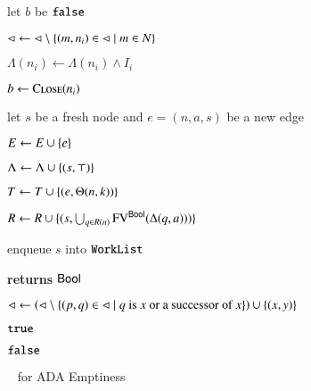 \documentclass[10pt,conference,letterpaper,twocolumn]{IEEEtran}
\begin{document}
\begin{algorithm}[t!]
{\begin{algorithmic}[1]
  \State let $b$ be $\mathtt{false}$



  \State $\lhd \leftarrow \lhd \setminus \left\{ (m,n_i) \in \lhd \mid m \in N \right\}$

  \State $\Lambda(n_i) \leftarrow \Lambda(n_i) \wedge I_i$


  \State $b \leftarrow \Call{Close}{n_i}$
  \label{ln:refine-end}

  \EndIf

  \EndIf

  \EndFor

  \EndIf

  \EndIf

  \label{ln:expand-begin}

  \State let $s$ be a fresh node and $e = (n,a,s)$ be a new edge

  \State $E \leftarrow E \cup \left\{ e \right\}$
  \label{ln:edge-insert}

  \State $\Lambda \leftarrow \Lambda \cup \left\{ (s,\top) \right\}$

  \State $T \leftarrow T \cup \left\{ (e, \Theta(n,k)) \right\}$

  \State $R \leftarrow R \cup \{(s,\bigcup_{q \in R(n)}\mathrm{FV}^{\mathsf{Bool}}(\Delta(q,a)))\}$

  \State enqueue $s$ into $\mathtt{WorkList}$
  \label{ln:expand-end}

  \EndFor

  \EndIf

  \EndWhile  
\end{algorithmic}

\begin{algorithmic}[1]
 {\bf returns} $\mathsf{Bool}$



\State $\lhd \leftarrow \left(\lhd \setminus \left\{  (p,q) \in \lhd \mid
  \text{$q$ is $x$ or a successor of $x$} \right\}\right) \cup \left\{ (x,y) \right\}$
\label{ln:close-uncover}

 $\mathtt{true}$ 

\EndIf

\EndFor

 $\mathtt{false}$

\EndFunction
\end{algorithmic}}
\caption{\impact~ for ADA Emptiness}
\label{alg:impact}
\end{algorithm}
\end{document}
